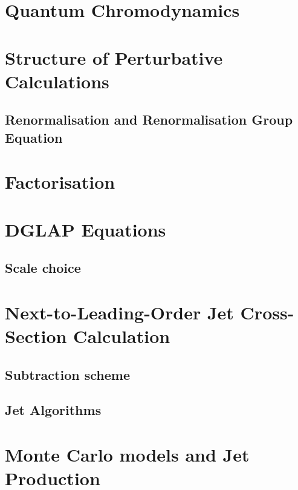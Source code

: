 \section{Quantum Chromodynamics}


\section{Structure of Perturbative Calculations}


\subsection{Renormalisation and Renormalisation Group Equation}


\section{Factorisation}


\section{DGLAP Equations}


\subsection{Scale choice}


\section{Next-to-Leading-Order Jet Cross-Section Calculation}


\subsection{Subtraction scheme}
\label{subsec:subscheme}

 
\subsection{Jet Algorithms}
\label{subsec:jetalgo}

%

\section{Monte Carlo models and Jet Production}
